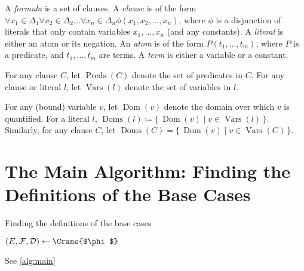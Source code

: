 \documentclass{article}
\DeclareMathOperator{\Dom}{Dom}
\DeclareMathOperator{\Doms}{Doms}
\DeclareMathOperator{\Preds}{Preds}
\DeclareMathOperator{\Vars}{Vars}
\begin{document}
A \emph{formula} is a set of clauses. A \emph{clause} is of the form
$\forall x_{1} \in \Delta_{1}\forall x_{2} \in \Delta_{2}\dots\forall x_{n} \in \Delta_{n} \phi(x_{1}, x_{2}, \dots, x_{n})$,
where $\phi$ is a disjunction of literals that only contain variables
$x_{1}, \dots, x_{n}$ (and any constants). A \emph{literal} is either an atom or
its negation. An \emph{atom} is of the form $P(t_{1}, \dots, t_{m})$, where $P$
is a predicate, and $t_{1}, \dots, t_{m}$ are terms. A \emph{term} is either a
variable or a constant.


For any clause $C$, let $\Preds(C)$ denote the set of predicates in $C$. For any
clause or literal $l$, let $\Vars(l)$ denote the set of variables in $l$.

For any (bound) variable $v$, let $\Dom(v)$ denote the domain over which $v$ is
quantified. For a literal $l$,
$\Doms(l) \coloneqq \{\, \Dom(v) \mid v \in \Vars(l) \,\}$. Similarly, for any
clause $C$, let $\Doms(C) = \{\, \Dom(v) \mid v \in \Vars(C) \,\}$.

\section{The Main Algorithm: Finding the Definitions of the Base
  Cases}\label{sec:main}

\begin{algorithm}[t]
  \caption{Finding the definitions of the base cases}\label{alg:main}
  $(E, \mathcal{F}, \mathcal{D}) \gets \Crane{$\phi$}$\;
\end{algorithm}

See \cref{alg:main}

\end{document}
